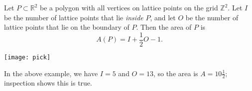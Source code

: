 \documentclass[12pt]{article}
\newcommand{\Ints}{\mathbb{Z}}
\newcommand{\Reals}{\mathbb{R}}
\begin{document}
Let $P\subset\Reals^2$ be a polygon with all vertices on lattice points on the grid $\Ints^2$.  Let $I$ be the number of lattice points that lie \emph{inside} $P$, and let $O$ be the number of lattice points that lie on the boundary of $P$.  Then the area of $P$ is
$$
A(P) = I + \frac{1}{2}O - 1.
$$

\begin{center}
\texttt{[image: pick]}
\end{center}
In the above example, we have $I=5$ and $O=13$, so the area is $A=10\frac{1}{2}$; inspection shows this is true.
\end{document}
